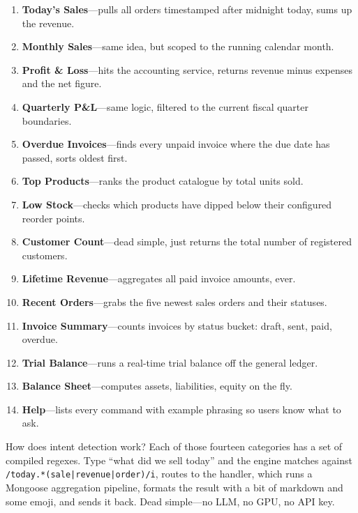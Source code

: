 \documentclass[conference]{IEEEtran}
\begin{document}
\begin{enumerate}
    \item \textbf{Today's Sales}---pulls all orders timestamped after midnight today, sums up the revenue.
    \item \textbf{Monthly Sales}---same idea, but scoped to the running calendar month.
    \item \textbf{Profit \& Loss}---hits the accounting service, returns revenue minus expenses and the net figure.
    \item \textbf{Quarterly P\&L}---same logic, filtered to the current fiscal quarter boundaries.
    \item \textbf{Overdue Invoices}---finds every unpaid invoice where the due date has passed, sorts oldest first.
    \item \textbf{Top Products}---ranks the product catalogue by total units sold.
    \item \textbf{Low Stock}---checks which products have dipped below their configured reorder points.
    \item \textbf{Customer Count}---dead simple, just returns the total number of registered customers.
    \item \textbf{Lifetime Revenue}---aggregates all paid invoice amounts, ever.
    \item \textbf{Recent Orders}---grabs the five newest sales orders and their statuses.
    \item \textbf{Invoice Summary}---counts invoices by status bucket: draft, sent, paid, overdue.
    \item \textbf{Trial Balance}---runs a real-time trial balance off the general ledger.
    \item \textbf{Balance Sheet}---computes assets, liabilities, equity on the fly.
    \item \textbf{Help}---lists every command with example phrasing so users know what to ask.
\end{enumerate}

How does intent detection work? Each of those fourteen categories has a set of compiled regexes. Type ``what did we sell today'' and the engine matches against \texttt{/today.*(sale|revenue|order)/i}, routes to the handler, which runs a Mongoose aggregation pipeline, formats the result with a bit of markdown and some emoji, and sends it back. Dead simple---no LLM, no GPU, no API key.
\end{document}
